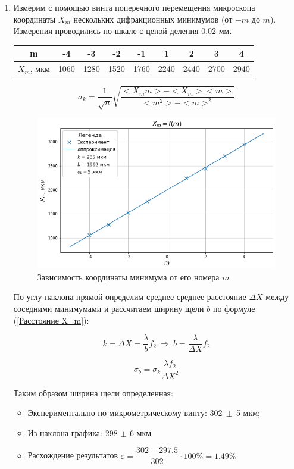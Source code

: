 \documentclass[a4paper, 12pt]{article}
\begin{document}
\begin{enumerate}
	\item Измерим с помощью винта поперечного перемещения микроскопа координаты $X_m$ нескольких дифракционных минимумов (от $-m$ до $m$). Измерения проводились по шкале с ценой деления 0,02 мм.

	\begin{center}
		\begin{tabular}{|c|c|c|c|c|c|c|c|c|}
			\hline
			m         & -4   & -3   & -2   & -1   & 1    & 2    & 3   & 4    \\ \hline
			$X_m$, мкм & 1060 & 1280 & 1520 & 1760 & 2240 & 2440 & 2700  & 2940 \\ \hline
		\end{tabular}
	\end{center}

	\[\sigma_k = \dfrac{1}{\sqrt{n}}\sqrt{\dfrac{<X_mm> - <X_m><m>}{<m^2> - <m>^2}}\]

	\begin{figure}[h!]
		\begin{center}
		\includegraphics[width=1\textwidth]{graph2.png}
		\caption{Зависимость координаты минимума от его номера $m$}
		\end{center}
	\end{figure}

	По углу наклона прямой определим среднее среднее расстояние $\Delta X$ между соседними минимумами и рассчитаем ширину щели $b$ по формуле (\ref{Расстояние X_m}):

\[k = \Delta X = \dfrac{\lambda}{b}f_2~\Rightarrow~b=\dfrac{\lambda}{\Delta X}f_2\]

\[\sigma_b = \sigma_k\dfrac{\lambda f_2}{\Delta X^2}\]

Таким образом ширина щели определенная:
\begin{itemize}
	\item Экспериментально по микрометрическому винту: 302$~\pm~$5 мкм;
	\item Из наклона графика: 298 $\pm$ 6 мкм
	\item Расхождение результатов $\varepsilon = \dfrac{302 - 297.5}{302} \cdot 100\% = 1.49\%$
\end{itemize}
\end{enumerate}
\end{document}
